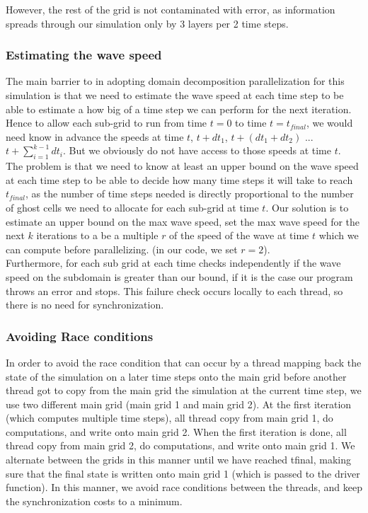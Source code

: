\documentclass[11pt]{article}
\begin{document}
However, the rest of the grid is not contaminated with error, as information spreads through our simulation only by 3 layers per 2 time steps.

\subsubsection{Estimating the wave speed}
The main barrier to in adopting domain decomposition parallelization for this simulation is that we need to estimate the wave speed at each time step to be able to estimate a how big of a time step we can perform for the next iteration. Hence to allow each sub-grid to run from time $t=0$ to time $t=t_{final}$, we would need know in advance the speeds at time $t$, $t + dt_1$, $t + (dt_1+dt_2)$ ... $t+\sum_{i=1}^{k-1}dt_i$. But we obviously do not have access to those speeds at time $t$. \\

The problem is that we need to know at least an upper bound on the wave speed at each time step to be able to decide how many time steps it will take to reach $t_{final}$, as the number of time steps needed is directly proportional to the number of ghost cells we need to allocate for each sub-grid at time $t$. Our solution is to estimate an upper bound on the max wave speed, set the max wave speed for the next $k$ iterations to a be a multiple $r$ of the speed of the wave at time $t$ which we can compute before parallelizing. (in our code, we set $r=2$). \\

Furthermore, for each sub grid at each time checks independently if the wave speed on the subdomain is greater than our bound, if it is the case our program throws an error and stops. This failure check occurs locally to each thread, so there is no need for synchronization. 

\subsubsection{Avoiding Race conditions}
In order to avoid the race condition that can occur by a thread mapping back the state of the simulation on a later time steps onto the main grid before another thread got to copy from the main grid the simulation at the current time step, we use two different main grid (main grid 1 and main grid 2). At the first iteration (which computes multiple time steps), all thread copy from main grid 1, do computations, and write onto main grid 2. When the first iteration is done, all thread copy from main grid 2, do computations, and write onto main grid 1. We alternate between the grids in this manner until we have reached tfinal, making sure that the final state is written onto main grid 1 (which is passed to the driver function). In this manner, we avoid race conditions between the threads, and keep the synchronization costs to a minimum.
\end{document}
